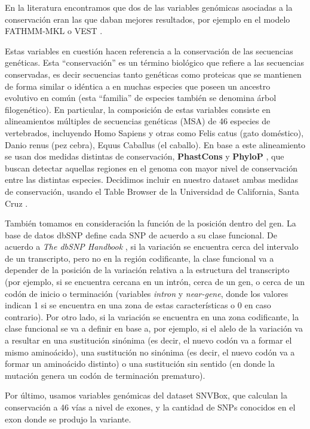 En la literatura encontramos que dos de las variables genómicas asociadas a la conservación eran las que daban mejores resultados, por ejemplo en el modelo FATHMM-MKL \cite{Shihab2015} o VEST \cite{Carter2013}.

Estas variables en cuestión hacen referencia a la conservación de las secuencias genéticas. Esta ``conservación'' es un término biológico que refiere a las secuencias conservadas, es decir secuencias tanto genéticas como proteicas que se mantienen de forma similar o idéntica a en muchas especies que poseen un ancestro evolutivo en común (esta ``familia'' de especies también se denomina árbol filogenético). En particular, la composición de estas variables consiste en alineamientos múltiples de secuencias genéticas (MSA) de 46 especies de vertebrados, incluyendo Homo Sapiens y otras como Felis catus (gato doméstico), Danio renus (pez cebra), Equus Caballus (el caballo). En base a este alineamiento se usan dos medidas distintas de conservación, \textbf{PhastCons} \cite{siepel2005evolutionarily} y \textbf{PhyloP} \cite{Pollard2010}, que buscan detectar aquellas regiones en el genoma con mayor nivel de conservación entre las distintas especies. Decidimos incluir en nuestro dataset ambas medidas de conservación, usando el Table Browser de la Universidad de California, Santa Cruz \cite{Karolchik2004}.

También tomamos en consideración la función de la posición dentro del gen. La base de datos dbSNP define cada SNP de acuerdo a su clase funcional. De acuerdo a \textit{The dbSNP Handbook} \cite{Ostell2007}, si la variación se encuentra cerca del intervalo de un transcripto, pero no en la región codificante,  la clase funcional va a depender de la posición de la variación relativa a la estructura del transcripto (por ejemplo, si se encuentra cercana en un intrón, cerca de un gen, o cerca de un codón de inicio o terminación (variables \textit{intron} y \textit{near-gene}, donde los valores indican 1 si se encuentra en una zona de estas características o 0 en caso contrario). Por otro lado, si la variación se encuentra en una zona codificante, la clase funcional se va a definir en base a, por ejemplo, si el alelo de la variación va a resultar en una sustitución sinónima (es decir, el nuevo codón va a formar el mismo aminoácido), una sustitución no sinónima (es decir, el nuevo codón va a formar un aminoácido distinto) o una sustitución sin sentido (en donde la mutación genera un codón de terminación prematuro).

Por último, usamos variables genómicas del dataset SNVBox, que calculan la conservación a 46 vías a nivel de exones, y la cantidad de SNPs conocidos en el exon donde se produjo la variante.

